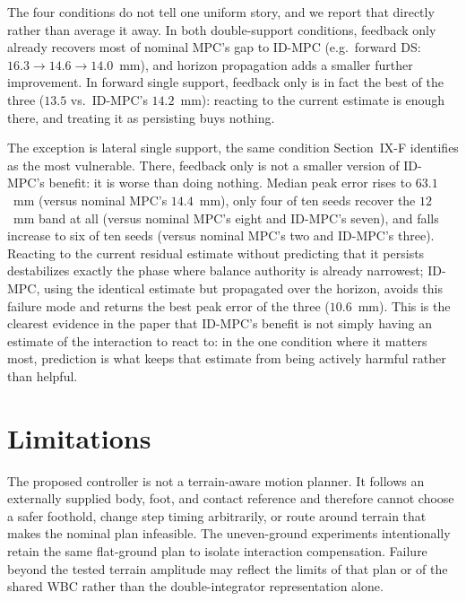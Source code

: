 \documentclass[journal]{IEEEtran}
\theoremstyle{plain}
\theoremstyle{definition}
\theoremstyle{remark}
\begin{document}
The four conditions do not tell one uniform story, and we report that directly rather than average it away. In both double-support conditions, feedback only already recovers most of nominal MPC's gap to ID-MPC (e.g.\ forward DS: $16.3\to14.6\to14.0$~mm), and horizon propagation adds a smaller further improvement. In forward single support, feedback only is in fact the best of the three ($13.5$ vs.\ ID-MPC's $14.2$~mm): reacting to the current estimate is enough there, and treating it as persisting buys nothing.

The exception is lateral single support, the same condition Section~IX-F identifies as the most vulnerable. There, feedback only is not a smaller version of ID-MPC's benefit: it is worse than doing nothing. Median peak error rises to $63.1$~mm (versus nominal MPC's $14.4$~mm), only four of ten seeds recover the $12$~mm band at all (versus nominal MPC's eight and ID-MPC's seven), and falls increase to six of ten seeds (versus nominal MPC's two and ID-MPC's three). Reacting to the current residual estimate without predicting that it persists destabilizes exactly the phase where balance authority is already narrowest; ID-MPC, using the identical estimate but propagated over the horizon, avoids this failure mode and returns the best peak error of the three ($10.6$~mm). This is the clearest evidence in the paper that ID-MPC's benefit is not simply having an estimate of the interaction to react to: in the one condition where it matters most, prediction is what keeps that estimate from being actively harmful rather than helpful.

\section{Limitations}\label{sec:limitations}

The proposed controller is not a terrain-aware motion planner. It follows an externally supplied body, foot, and contact reference and therefore cannot choose a safer foothold, change step timing arbitrarily, or route around terrain that makes the nominal plan infeasible. The uneven-ground experiments intentionally retain the same flat-ground plan to isolate interaction compensation. Failure beyond the tested terrain amplitude may reflect the limits of that plan or of the shared WBC rather than the double-integrator representation alone.
\end{document}
